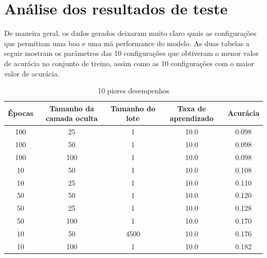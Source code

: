 \documentclass{article}
\begin{document}
\section{Análise dos resultados de teste}

De maneira geral, os dados gerados deixaram muito claro quais as configurações que permitiam uma boa e uma má performance do modelo. As duas tabelas a seguir mostram os parâmetros das 10 configurações que obtiveram o menor valor de acurácia no conjunto de treino, assim como as 10 configurações com o maior valor de acurácia.

\begin{table}[H]
    \centering
        \captionsetup{labelformat=empty} 
        \caption{10 piores desempenhos}
        \begin{tabular}{| c c c c c |}
        \hline
        Épocas & Tamanho da camada oculta & Tamanho do lote & Taxa de aprendizado & Acurácia \\
        \hline
            100 &  25 &    1 & 10.0 & 0.098 \\
            100 &  50 &    1 & 10.0 & 0.098 \\
            100 & 100 &    1 & 10.0 & 0.098 \\
            10 &  50 &    1 & 10.0 & 0.108 \\
            10 &  25 &    1 & 10.0 & 0.110 \\
            50 &  50 &    1 & 10.0 & 0.120 \\
            50 &  25 &    1 & 10.0 & 0.128 \\
            50 & 100 &    1 & 10.0 & 0.170 \\
            10 &  50 & 4500 & 10.0 & 0.176 \\
            10 & 100 &    1 & 10.0 & 0.182 \\
        \hline
        \end{tabular}
\end{table}
\end{document}
